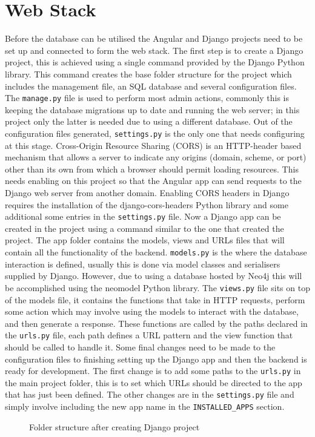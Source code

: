 \section{Web Stack}
Before the database can be utilised the Angular and Django projects need to be set up and connected to form the web stack.
The first step is to create a Django project, this is achieved using a single command provided by the Django Python library. 
This command creates the base folder structure for the project which includes the management file, an SQL database and several configuration files.
The \verb|manage.py| file is used to perform most admin actions, commonly this is keeping the database migrations up to date and running the web server; 
in this project only the latter is needed due to using a different database. Out of the configuration files generated, \verb|settings.py| 
is the only one that needs configuring at this stage. Cross-Origin Resource Sharing (CORS) is an HTTP-header based mechanism that allows a server to 
indicate any origins (domain, scheme, or port) other than its own from which a browser should permit loading resources.\cite{CrossOriginResourceSharing2023}
This needs enabling on this project so that the Angular app can send requests to the Django web server from another domain. Enabling CORS headers in Django 
requires the installation of the django-cors-headers Python library and some additional some entries in the \verb|settings.py| file. 
Now a Django app can be created in the project using a command similar to the one that created the project. The app folder contains the models, views and URLs files 
that will contain all the functionality of the backend. \verb|models.py| is the where the database interaction is defined, usually this is done via model classes 
and serialisers supplied by Django. However, due to using a database hosted by Neo4j this will be accomplished using the neomodel Python library. 
The \verb|views.py| file sits on top of the models file, it contains the functions that take in HTTP requests, perform some action which may involve using the models 
to interact with the database, and then generate a response. These functions are called by the paths declared in the \verb|urls.py| file, each path defines a URL pattern 
and the view function that should be called to handle it. Some final changes need to be made to the configuration files to finishing setting up the Django app and then the 
backend is ready for development. The first change is to add some paths to the \verb|urls.py| in the main project folder, this is to set which URLs should be directed 
to the app that has just been defined. The other changes are in the \verb|settings.py| file and simply involve including the new app name in the \verb|INSTALLED_APPS| 
section.
\begin{figure}[H]
    \caption{Folder structure after creating Django project}
\end{figure}

